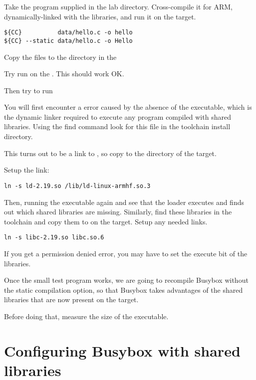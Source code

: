 Take the  program supplied in the lab 
directory. Cross-compile it for ARM, dynamically-linked with the
libraries, and run it on the target.

\begin{verbatim}
${CC}          data/hello.c -o hello
${CC} --static data/hello.c -o Hello
\end{verbatim}

Copy the files to the  directory in the   

Try run  on the \devboard. This should work OK.

Then try to run 

You will first encounter a  error caused by the absence of
the  executable, which is the dynamic linker
required to execute any program compiled with shared libraries. Using
the find command look for this file in the toolchain install directory.

This turns out to be a link to , so copy 
to the  directory of the target.

Setup the link:

\begin{verbatim}
ln -s ld-2.19.so /lib/ld-linux-armhf.so.3
\end{verbatim}

Then, running the executable again and see that the loader executes
and finds out which shared libraries are missing. Similarly, find
these libraries in the toolchain and copy them to  on the
target. Setup any needed links.

\begin{verbatim}
ln -s libc-2.19.so libc.so.6
\end{verbatim}

If you get a permission denied error, you may have to set the execute bit
of the libraries.

Once the small test program works, we are going to recompile Busybox
without the static compilation option, so that Busybox takes advantages of the
shared libraries that are now present on the target.

Before doing that, measure the size of the  executable.

\section{Configuring Busybox with shared libraries}

